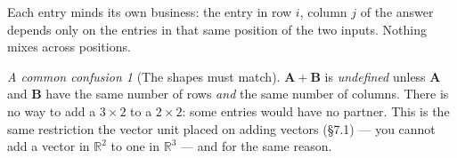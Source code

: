 \documentclass[11pt]{article}
\theoremstyle{plain}
\theoremstyle{definition}
\theoremstyle{remark}
\newtheorem*{warn}{A common confusion}
\newcommand{\R}{\mathbb{R}}
\newcommand{\mt}[1]{\mathbf{#1}}        %
\begin{document}
\noindent Each entry minds its own business: the entry in row $i$, column $j$ of
the answer depends only on the entries in that same position of the two inputs.
Nothing mixes across positions.

\begin{warn}[The shapes must match]
$\mt{A}+\mt{B}$ is \emph{undefined} unless $\mt{A}$ and $\mt{B}$ have the same
number of rows \emph{and} the same number of columns. There is no way to add a
$3\times2$ to a $2\times2$: some entries would have no partner. This is the same
restriction the vector unit placed on adding vectors (\S7.1) --- you cannot add
a vector in $\R^{2}$ to one in $\R^{3}$ --- and for the same reason.
\end{warn}

\end{document}
